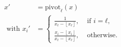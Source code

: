 \documentclass[aspectratio=169]{beamer}
\newcommand\floor[1]{\left\lfloor#1\right\rfloor}
\begin{document}
\begin{frame}[fragile]
\begin{columns}
\begin{center}
    \end{center}
    \begin{align*}
      x' & = \mathrm{pivot}_ℓ(x) \\
      \text{ with } x_i' & =
      \begin{cases}
        \frac{1}{x_ℓ - \floor{x_ℓ}}, & \text{ if } i = ℓ, \\
        \frac{x_i - \floor{x_i}}{x_ℓ - \floor{x_ℓ}}, & \text{ otherwise}.
      \end{cases}
    \end{align*}
  \end{columns}
\end{frame}
\end{document}
